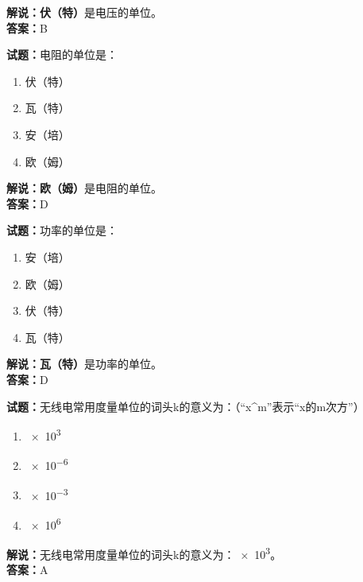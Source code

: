 \documentclass{ctexbook}
\begin{document}
\noindent\textbf{解说：伏（特）}是电压的单位。\\
\noindent\textbf{答案：}B

\vspace{\baselineskip}

\noindent\textbf{试题：}电阻的单位是：

\begin{enumerate}[leftmargin=3em]
  \item 伏（特）
  \item 瓦（特）
  \item 安（培）
  \item 欧（姆）
\end{enumerate}

\noindent\textbf{解说：欧（姆）}是电阻的单位。\\
\noindent\textbf{答案：}D

\vspace{\baselineskip}

\noindent\textbf{试题：}功率的单位是：

\begin{enumerate}[leftmargin=3em]
  \item 安（培）
  \item 欧（姆）
  \item 伏（特）
  \item 瓦（特）
\end{enumerate}

\noindent\textbf{解说：瓦（特）}是功率的单位。\\
\noindent\textbf{答案：}D

\vspace{\baselineskip}

\noindent\textbf{试题：}无线电常用度量单位的词头k的意义为：（“x\string^m”表示“x的m次方”）

\begin{enumerate}[leftmargin=3em]
  \item \num{e3}%
  \item \num{e-6}%
  \item \num{e-3}%
  \item \num{e6}%
\end{enumerate}

\noindent\textbf{解说：}无线电常用度量单位的词头k的意义为：\num{e3}。\\
\noindent\textbf{答案：}A

\vspace{\baselineskip}
\end{document}
